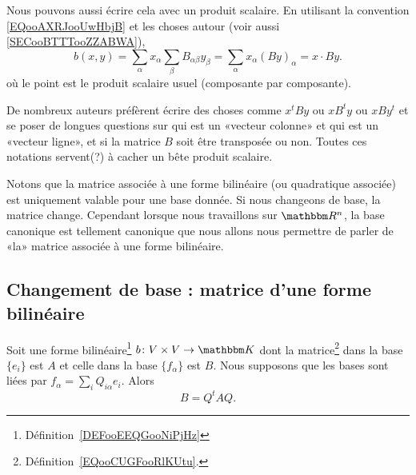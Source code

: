 Nous pouvons aussi écrire cela avec un produit scalaire. En utilisant la convention \eqref{EQooAXRJooUwHbjB} et les choses autour (voir aussi \ref{SECooBTTTooZZABWA}),
\begin{equation}
    b(x,y)=\sum_{\alpha}x_{\alpha}\sum_{\beta}B_{\alpha\beta}y_{\beta}=\sum_{\alpha}x_{\alpha}(By)_{\alpha}=x\cdot By.
\end{equation}
où le point est le produit scalaire usuel (composante par composante).

\begin{normaltext}
    De nombreux auteurs préfèrent écrire des choses comme \( x^tBy\) ou \( xB^ty\) ou \( xBy^t\) et se poser de longues questions sur qui est un «vecteur colonne» et qui est un «vecteur ligne», et si la matrice \( B\) soit être transposée ou non. Toutes ces notations servent(?) à cacher un bête produit scalaire.
\end{normaltext}

\begin{normaltext}
    Notons que la matrice associée à une forme bilinéaire (ou quadratique associée) est uniquement valable pour une base donnée. Si nous changeons de base, la matrice change. Cependant lorsque nous travaillons sur \( \eR^n\), la base canonique est tellement canonique que nous allons nous permettre de parler de «la» matrice associée à une forme bilinéaire.
\end{normaltext}

\subsection{Changement de base : matrice d'une forme bilinéaire}

\begin{proposition}     \label{PROPooLBIOooUpzxXA}
    
    Soit une forme bilinéaire\footnote{Définition~\ref{DEFooEEQGooNiPjHz}} \( b\colon V\times V\to \eK\) dont la matrice\footnote{Définition~\ref{EQooCUGFooRlKUtu}.} dans la base \( \{ e_i \}\) est \( A\) et celle dans la base \( \{ f_{\alpha} \}\) est \( B\). Nous supposons que les bases sont liées par \( f_{\alpha}=\sum_{i}Q_{i\alpha}e_i\). Alors
\begin{equation}        \label{EQooZUVTooKjqnJj}
    B=Q^tAQ.
\end{equation}
\end{proposition}


